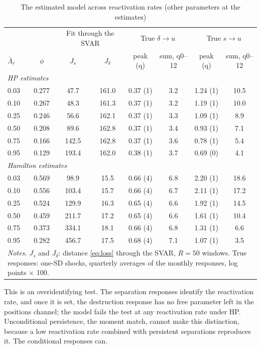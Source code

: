 \documentclass[authoryear, review, 12pt]{elsarticle}
\begin{document}
\begin{table}[H]
\centering
\caption{The estimated model across reactivation rates (other parameters at the estimates)}\label{tab:reactivation}
\small
\begin{tabular}{lccccccc}
\toprule
 & & \multicolumn{2}{c}{Fit through the SVAR} & \multicolumn{2}{c}{True $\delta\to u$} & \multicolumn{2}{c}{True $s\to u$} \\
$\bar\Lambda_r$ & $\phi$ & $J_s$ & $J_\delta$ & peak (q) & sum, q0--12 & peak (q) & sum, q0--12 \\
\midrule
\multicolumn{8}{l}{\textit{HP estimates}} \\
0.03 & 0.277 & 47.7 & 161.0 & 0.37 (1) & 3.2 & 1.24 (1) & 10.5 \\
0.10 & 0.267 & 48.3 & 161.3 & 0.37 (1) & 3.2 & 1.19 (1) & 10.0 \\
0.25 & 0.246 & 56.6 & 162.1 & 0.37 (1) & 3.3 & 1.09 (1) & 8.9 \\
0.50 & 0.208 & 89.6 & 162.8 & 0.37 (1) & 3.4 & 0.93 (1) & 7.1 \\
0.75 & 0.166 & 142.5 & 162.8 & 0.37 (1) & 3.6 & 0.78 (1) & 5.4 \\
0.95 & 0.129 & 193.4 & 162.0 & 0.38 (1) & 3.7 & 0.69 (0) & 4.1 \\
\multicolumn{8}{l}{\textit{Hamilton estimates}} \\
0.03 & 0.569 & 98.9 & 15.5 & 0.66 (4) & 6.8 & 2.20 (1) & 18.6 \\
0.10 & 0.556 & 103.4 & 15.7 & 0.66 (4) & 6.7 & 2.11 (1) & 17.2 \\
0.25 & 0.524 & 129.9 & 16.3 & 0.65 (4) & 6.6 & 1.92 (1) & 14.5 \\
0.50 & 0.459 & 211.7 & 17.2 & 0.65 (4) & 6.6 & 1.61 (1) & 10.4 \\
0.75 & 0.373 & 334.1 & 18.1 & 0.66 (4) & 6.8 & 1.31 (1) & 6.6 \\
0.95 & 0.282 & 456.7 & 17.5 & 0.68 (4) & 7.1 & 1.07 (1) & 3.5 \\
\bottomrule
\multicolumn{8}{p{0.9\linewidth}}{\footnotesize \textit{Notes.} $J_s$ and $J_\delta$: distance \eqref{eq:loss} through the SVAR, $R=50$ windows. True responses: one-SD shocks, quarterly averages of the monthly responses, log points $\times$ 100.}
\end{tabular}
\end{table}

This is an overidentifying test. The separation responses identify the reactivation rate, and once it is set, the destruction response has no free parameter left in the positions channel; the model fails the test at any reactivation rate under HP. Unconditional persistence, the moment \citet{coles_2018} match, cannot make this distinction, because a low reactivation rate combined with persistent separations reproduces it. The conditional responses can.
\end{document}
